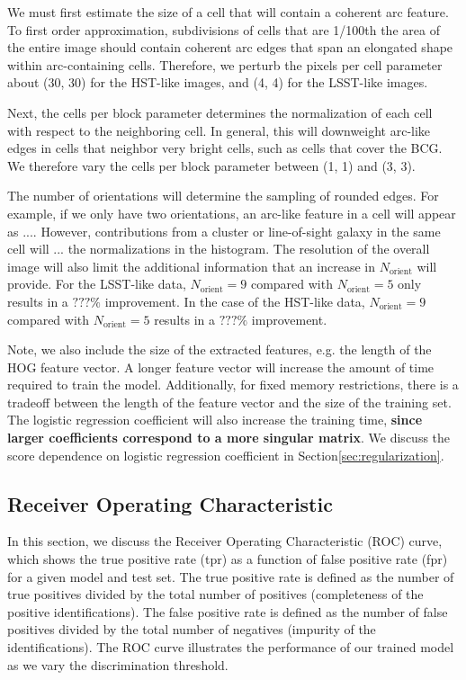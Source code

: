 \documentclass{emulateapj}
\newcommand{\todo}[1]{{\bf\color{blue} #1}}
\begin{document}
We must first estimate the size of a cell that will contain a coherent
arc feature.  To first order approximation, subdivisions of cells that
are 1/100th the area of the entire image should contain coherent arc
edges that span an elongated shape within arc-containing cells.
Therefore, we perturb the pixels per cell parameter about (30, 30) for
the HST-like images, and (4, 4) for the LSST-like images.

Next, the cells per block parameter determines the normalization of
each cell with respect to the neighboring cell.  In general, this will
downweight arc-like edges in cells that neighbor very bright cells,
such as cells that cover the BCG.  We therefore vary the cells per
block parameter between (1, 1) and (3, 3).

The number of orientations will determine the sampling of rounded
edges.  For example, if we only have two orientations, an arc-like
feature in a cell will appear as .... However, contributions from a
cluster or line-of-sight galaxy in the same cell will ... the
normalizations in the histogram.  The resolution of the overall image
will also limit the additional information that an increase in
$N_\text{orient}$ will provide.  For the LSST-like data,
$N_\text{orient}=9$ compared with $N_\text{orient}=5$ only
results in a $???\%$ improvement.  In the case of the HST-like data,
$N_\text{orient}=9$ compared with $N_\text{orient}=5$
results in a $???\%$ improvement.

Note, we also include the size of the extracted features, e.g. the
length of the HOG feature vector.  A longer feature vector will
increase the amount of time required to train the model.
Additionally, for fixed memory restrictions, there is a tradeoff
between the length of the feature vector and the size of the training
set.  The logistic regression coefficient will also increase the
training time, \todo{since larger coefficients correspond to a more
  singular matrix}.  We discuss the score dependence on logistic
regression coefficient in Section\ref{sec:regularization}.

\subsection{Receiver Operating Characteristic}

In this section, we discuss the Receiver Operating Characteristic
(ROC) curve, which shows the true positive rate (tpr) as a function of
false positive rate (fpr) for a given model and test set.  The true
positive rate is defined as the number of true positives divided by
the total number of positives (completeness of the positive
identifications).  The false positive rate is defined as the number of
false positives divided by the total number of negatives (impurity of
the identifications).  The ROC curve illustrates the performance of
our trained model as we vary the discrimination threshold.
\end{document}
